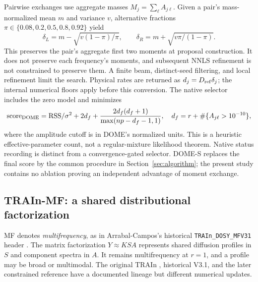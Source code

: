 Pairwise exchanges use aggregate masses $M_j=\sum_\ell A_{j\ell}$. Given a pair's mass-normalized mean $m$ and variance $v$, alternative fractions $\pi\in\{0.08,0.2,0.5,0.8,0.92\}$ yield
\begin{equation}\label{eq:domeexchange}
 \delta_L=m-\sqrt{v(1-\pi)/\pi},\qquad \delta_R=m+\sqrt{v\pi/(1-\pi)}.
\end{equation}
This preserves the pair's aggregate first two moments at proposal construction. It does not preserve each frequency's moments, and subsequent NNLS refinement is not constrained to preserve them. A finite beam, distinct-seed filtering, and local refinement limit the search. Physical rates are returned as $d_j=D_{\rm ref}\delta_j$; the internal numerical floors apply before this conversion. The native selector includes the zero model and minimizes
\begin{equation}\label{eq:domescore}
 \mathrm{score}_{\rm DOME}=\mathrm{RSS}/\sigma^2+2d_f+
 \frac{2d_f(d_f+1)}{\max(np-d_f-1,1)},
 \quad d_f=r+\#\{A_{j\ell}>10^{-10}\},
\end{equation}
where the amplitude cutoff is in DOME's normalized units. This is a heuristic effective-parameter count, not a regular-mixture likelihood theorem. Native status recording is distinct from a convergence-gated selector. DOME-S replaces the final score by the common procedure in Section~\ref{sec:algorithm}; the present study contains no ablation proving an independent advantage of moment exchange.

\subsection{TRAIn-MF: a shared distributional factorization}\label{sec:mfmath}
MF denotes \emph{multifrequency}, as in Arrabal-Campos's historical \texttt{TRAIn\_DOSY\_MFV31} header \cite{mfv31}. The matrix factorization $Y\approx KSA$ represents shared diffusion profiles in $S$ and component spectra in $A$. It remains multifrequency at $r=1$, and a profile may be broad or multimodal. The original TRAIn \cite{train}, historical V3.1, and the later constrained reference have a documented lineage but different numerical updates.

